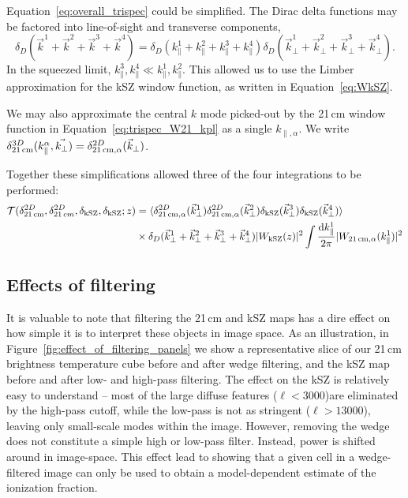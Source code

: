 Equation~\ref{eq:overall_trispec} could be simplified. The Dirac delta functions may be factored into line-of-sight and transverse components,
\begin{equation}
\delta_D(\vec{k}^1 + \vec{k}^2 + \vec{k}^3 + \vec{k}^4) = \delta_D(k^1_{\parallel} + k^2_{\parallel} + k^3_{\parallel} + k^4_{\parallel})\delta_D(\vec{k}^1_{\perp} + \vec{k}^2_{\perp} + \vec{k}^3_{\perp} + \vec{k}^4_{\perp}).
\end{equation}
In the squeezed limit, $k^3_{\parallel},k^4_{\parallel} \ll k^1_{\parallel},k^2_{\parallel}$. This allowed us to use the Limber approximation for the kSZ window function, as written in Equation~\ref{eq:WkSZ}. 

We may also approximate the central $k$ mode picked-out by the 21\,cm window function in Equation~\ref{eq:trispec_W21_kpl} as a single $k_{\parallel,\alpha}$. We write $\delta^{3D}_{\rm 21\,cm}(k^{\alpha}_{\parallel},\vec{k_{\perp}}) = \delta^{2D}_{\rm 21\,cm,\alpha}(\vec{k}_{\perp})$.

Together these simplifications allowed three of the four integrations to be performed:
\begin{equation}
\begin{split}
\mathcal{T}(\delta^{2D}_{\rm 21\,cm}, \delta^{2D}_{21\,cm}, \delta_{\rm kSZ}, \delta_{\rm kSZ}; z) &= 
\langle \delta^{2D}_{\rm 21\,cm,\alpha}(\vec{k}^1_{\perp})  \delta^{2D}_{\rm 21\,cm,\alpha}(\vec{k}^2_{\perp})  \delta_{\rm kSZ}(\vec{k}^3_{\perp})\delta_{\rm kSZ}(\vec{k}^4_{\perp}) \rangle \\ 
& \times \delta_D(\vec{k}^1_{\perp} + \vec{k}^2_{\perp} + \vec{k}^3_{\perp} + \vec{k}^4_{\perp}) | W_{\rm kSZ}(z) |^2\int \frac{{\rm d}k^1_{\parallel}}{2\pi} | W_{\rm 21\,cm,\alpha} (k^1_{\parallel}) |^2
\end{split}
\label{eq:squeezed_trispec}
\end{equation}

\subsection{Effects of filtering}

It is valuable to note that filtering the 21\,cm and kSZ maps has a dire effect on how simple it is to interpret these objects in image space. As an illustration, in Figure~\ref{fig:effect_of_filtering_panels} we show a representative slice of our 21\,cm brightness temperature cube before and after wedge filtering, and the kSZ map before and after low- and high-pass filtering. The effect on the kSZ is relatively easy to understand -- most of the large diffuse features ($\ell < 3000$)are eliminated by the high-pass cutoff, while the low-pass is not as stringent ($\ell > 13000$), leaving only small-scale modes within the image. However, removing the wedge does not constitute a simple high or low-pass filter. Instead, power is shifted around in image-space. This effect lead to \cite{Beardsley.15} showing that a given cell in a wedge-filtered image can only be used to obtain a model-dependent estimate of the ionization fraction.

